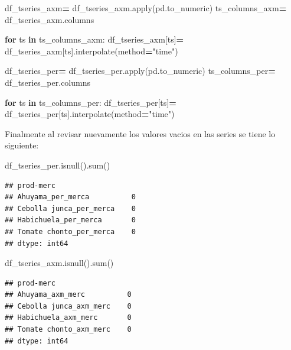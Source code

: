 \documentclass[
]{book}
\newenvironment{Shaded}{\begin{snugshade}}{\end{snugshade}}
\newcommand{\BuiltInTok}[1]{#1}
\newcommand{\ControlFlowTok}[1]{\textcolor[rgb]{0.13,0.29,0.53}{\textbf{#1}}}
\newcommand{\KeywordTok}[1]{\textcolor[rgb]{0.13,0.29,0.53}{\textbf{#1}}}
\newcommand{\NormalTok}[1]{#1}
\newcommand{\OperatorTok}[1]{\textcolor[rgb]{0.81,0.36,0.00}{\textbf{#1}}}
\newcommand{\StringTok}[1]{\textcolor[rgb]{0.31,0.60,0.02}{#1}}
\begin{document}
\begin{Shaded}
\begin{Highlighting}[]

\NormalTok{df\_tseries\_axm}\OperatorTok{=}\NormalTok{ df\_tseries\_axm.}\BuiltInTok{apply}\NormalTok{(pd.to\_numeric)}
\NormalTok{ts\_columns\_axm}\OperatorTok{=}\NormalTok{ df\_tseries\_axm.columns }

\ControlFlowTok{for}\NormalTok{ ts }\KeywordTok{in}\NormalTok{ ts\_columns\_axm:}
\NormalTok{    df\_tseries\_axm[ts]}\OperatorTok{=}\NormalTok{ df\_tseries\_axm[ts].interpolate(method}\OperatorTok{=}\StringTok{"time"}\NormalTok{)}
    
    

\NormalTok{df\_tseries\_per}\OperatorTok{=}\NormalTok{ df\_tseries\_per.}\BuiltInTok{apply}\NormalTok{(pd.to\_numeric)}
\NormalTok{ts\_columns\_per}\OperatorTok{=}\NormalTok{ df\_tseries\_per.columns }

\ControlFlowTok{for}\NormalTok{ ts }\KeywordTok{in}\NormalTok{ ts\_columns\_per:}
\NormalTok{    df\_tseries\_per[ts]}\OperatorTok{=}\NormalTok{ df\_tseries\_per[ts].interpolate(method}\OperatorTok{=}\StringTok{"time"}\NormalTok{)}
\end{Highlighting}
\end{Shaded}

Finalmente al revisar nuevamente los valores vacios en las series se tiene lo siguiente:

\begin{Shaded}
\begin{Highlighting}[]

\NormalTok{df\_tseries\_per.isnull().}\BuiltInTok{sum}\NormalTok{()}
\end{Highlighting}
\end{Shaded}

\begin{verbatim}
## prod-merc
## Ahuyama_per_merca          0
## Cebolla junca_per_merca    0
## Habichuela_per_merca       0
## Tomate chonto_per_merca    0
## dtype: int64
\end{verbatim}

\begin{Shaded}
\begin{Highlighting}[]
\NormalTok{df\_tseries\_axm.isnull().}\BuiltInTok{sum}\NormalTok{()}
\end{Highlighting}
\end{Shaded}

\begin{verbatim}
## prod-merc
## Ahuyama_axm_merc          0
## Cebolla junca_axm_merc    0
## Habichuela_axm_merc       0
## Tomate chonto_axm_merc    0
## dtype: int64
\end{verbatim}
\end{document}
